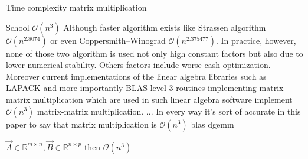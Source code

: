 Time complexity matrix multiplication

School  $\mathcal{O}(n^{3})$
Although faster algorithm exists like
Strassen algorithm $\mathcal{O}(n^{2.8074})$ or even
Coppersmith–Winograd $\mathcal {O}(n^{2.375477})$.
In practice, however, none of those two algorithm is used not only high constant factors but also due to lower numerical stability. Others factors include worse cash optimization.
Moreover current implementations of the linear algebra libraries such as LAPACK and more importantly BLAS level 3 routines implementing  matrix-matrix multiplication which are used in such linear algebra software implement $\mathcal{O}(n^{3})$ matrix-matrix multiplication. 
... In every way it's sort of accurate in this paper to say that matrix multiplication is $\mathcal{O}(n^{3})$
blas dgemm

$ \vec{A} \in \mathbb{R}^{m \times n}, \vec{B} \in \mathbb{R}^{n\times p}$ then $ \mathcal{O}(n^{3})$